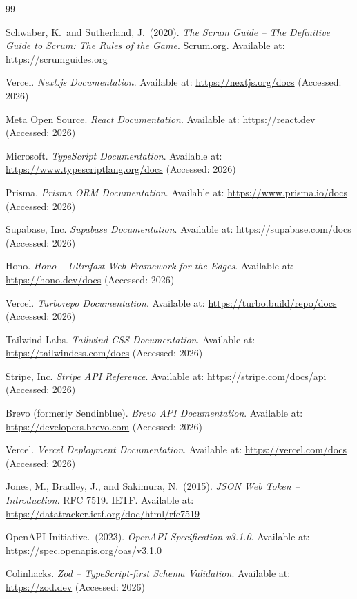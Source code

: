 \documentclass[12pt,a4paper]{report}
\begin{document}
\begin{thebibliography}{99}

    Schwaber, K.\ and Sutherland, J.\ (2020).
    \textit{The Scrum Guide -- The Definitive Guide to Scrum: The Rules of the
    Game}.
    Scrum.org.
    Available at: \url{https://scrumguides.org}

    Vercel.
    \textit{Next.js Documentation}.
    Available at: \url{https://nextjs.org/docs}
    (Accessed: 2026)

    Meta Open Source.
    \textit{React Documentation}.
    Available at: \url{https://react.dev}
    (Accessed: 2026)

    Microsoft.
    \textit{TypeScript Documentation}.
    Available at: \url{https://www.typescriptlang.org/docs}
    (Accessed: 2026)

    Prisma.
    \textit{Prisma ORM Documentation}.
    Available at: \url{https://www.prisma.io/docs}
    (Accessed: 2026)

    Supabase, Inc.
    \textit{Supabase Documentation}.
    Available at: \url{https://supabase.com/docs}
    (Accessed: 2026)

    Hono.
    \textit{Hono -- Ultrafast Web Framework for the Edges}.
    Available at: \url{https://hono.dev/docs}
    (Accessed: 2026)

    Vercel.
    \textit{Turborepo Documentation}.
    Available at: \url{https://turbo.build/repo/docs}
    (Accessed: 2026)

    Tailwind Labs.
    \textit{Tailwind CSS Documentation}.
    Available at: \url{https://tailwindcss.com/docs}
    (Accessed: 2026)

    Stripe, Inc.
    \textit{Stripe API Reference}.
    Available at: \url{https://stripe.com/docs/api}
    (Accessed: 2026)

    Brevo (formerly Sendinblue).
    \textit{Brevo API Documentation}.
    Available at: \url{https://developers.brevo.com}
    (Accessed: 2026)

    Vercel.
    \textit{Vercel Deployment Documentation}.
    Available at: \url{https://vercel.com/docs}
    (Accessed: 2026)

    Jones, M., Bradley, J., and Sakimura, N.\ (2015).
    \textit{JSON Web Token -- Introduction}.
    RFC 7519. IETF.
    Available at: \url{https://datatracker.ietf.org/doc/html/rfc7519}

    OpenAPI Initiative.\ (2023).
    \textit{OpenAPI Specification v3.1.0}.
    Available at: \url{https://spec.openapis.org/oas/v3.1.0}

    Colinhacks.
    \textit{Zod -- TypeScript-first Schema Validation}.
    Available at: \url{https://zod.dev}
    (Accessed: 2026)

\end{thebibliography}
\end{document}
